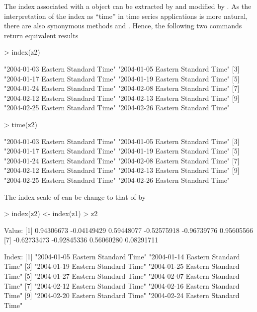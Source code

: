 \documentclass{Z}
\begin{document}
The index associated with a  object can be extracted
by  and modified by . As the interpretation
of the index as ``time'' in time series applications is more natural,
there are also synonymous methods  and . 
Hence, the following two commands return equivalent results
\begin{Schunk}
\begin{Sinput}
> index(z2)
\end{Sinput}
\begin{Soutput}
 [1] "2004-01-03 Eastern Standard Time" "2004-01-05 Eastern Standard Time"
 [3] "2004-01-17 Eastern Standard Time" "2004-01-19 Eastern Standard Time"
 [5] "2004-01-24 Eastern Standard Time" "2004-02-08 Eastern Standard Time"
 [7] "2004-02-12 Eastern Standard Time" "2004-02-13 Eastern Standard Time"
 [9] "2004-02-25 Eastern Standard Time" "2004-02-26 Eastern Standard Time"
\end{Soutput}
\begin{Sinput}
> time(z2)
\end{Sinput}
\begin{Soutput}
 [1] "2004-01-03 Eastern Standard Time" "2004-01-05 Eastern Standard Time"
 [3] "2004-01-17 Eastern Standard Time" "2004-01-19 Eastern Standard Time"
 [5] "2004-01-24 Eastern Standard Time" "2004-02-08 Eastern Standard Time"
 [7] "2004-02-12 Eastern Standard Time" "2004-02-13 Eastern Standard Time"
 [9] "2004-02-25 Eastern Standard Time" "2004-02-26 Eastern Standard Time"
\end{Soutput}
\end{Schunk}
The index scale of  can be change to that of  by
\begin{Schunk}
\begin{Sinput}
> index(z2) <- index(z1)
> z2
\end{Sinput}
\begin{Soutput}
Value:
 [1]  0.94306673 -0.04149429  0.59448077 -0.52575918 -0.96739776  0.95605566
 [7] -0.62733473 -0.92845336  0.56060280  0.08291711

Index:
 [1] "2004-01-05 Eastern Standard Time" "2004-01-14 Eastern Standard Time"
 [3] "2004-01-19 Eastern Standard Time" "2004-01-25 Eastern Standard Time"
 [5] "2004-01-27 Eastern Standard Time" "2004-02-07 Eastern Standard Time"
 [7] "2004-02-12 Eastern Standard Time" "2004-02-16 Eastern Standard Time"
 [9] "2004-02-20 Eastern Standard Time" "2004-02-24 Eastern Standard Time"
\end{Soutput}
\end{Schunk}
\end{document}
